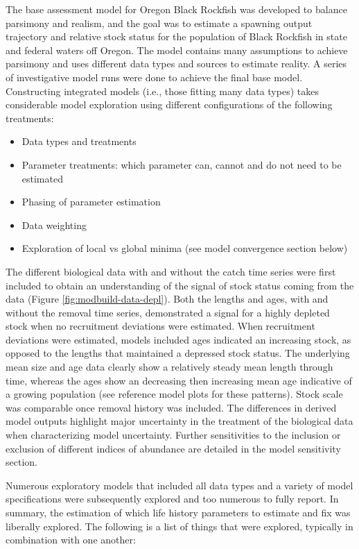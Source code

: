 \documentclass[11pt,
  english,
  letterpaper,
]{article}
\providecommand{\tightlist}{%
  \setlength{\itemsep}{0pt}\setlength{\parskip}{0pt}}
\providecommand{\tightlist}{%
  \setlength{\itemsep}{0pt}\setlength{\parskip}{0pt}}
\begin{document}
The base assessment model for Oregon Black Rockfish was developed to balance parsimony and realism, and the goal was to estimate a spawning output trajectory and relative stock status for the population of Black Rockfish in state and federal waters off Oregon. The model contains many assumptions to achieve parsimony and uses different data types and sources to estimate reality. A series of investigative model runs were done to achieve the final base model. Constructing integrated models (i.e., those fitting many data types) takes considerable model exploration using different configurations of the following treatments:

\begin{itemize}
\tightlist
\item
  Data types and treatments
\item
  Parameter treatments: which parameter can, cannot and do not need to be estimated
\item
  Phasing of parameter estimation
\item
  Data weighting
\item
  Exploration of local vs global minima (see model convergence section below)
\end{itemize}

The different biological data with and without the catch time series were first included to obtain an understanding of the signal of stock status coming from the data (Figure \ref{fig:modbuild-data-depl}). Both the lengths and ages, with and without the removal time series, demonstrated a signal for a highly depleted stock when no recruitment deviations were estimated. When recruitment deviations were estimated, models included ages indicated an increasing stock, as opposed to the lengths that maintained a depressed stock status. The underlying mean size and age data clearly show a relatively steady mean length through time, whereas the ages show an decreasing then increasing mean age indicative of a growing population (see reference model plots for these patterns). Stock scale was comparable once removal history was included. The differences in derived model outputs highlight major uncertainty in the treatment of the biological data when characterizing model uncertainty. Further sensitivities to the inclusion or exclusion of different indices of abundance are detailed in the model sensitivity section.

Numerous exploratory models that included all data types and a variety of model specifications were subsequently explored and too numerous to fully report. In summary, the estimation of which life history parameters to estimate and fix was liberally explored. The following is a list of things that were explored, typically in combination with one another:
\end{document}
